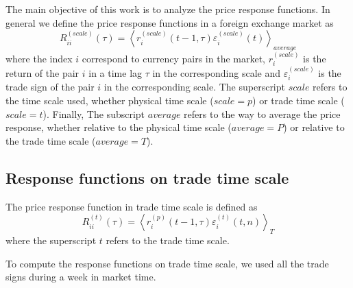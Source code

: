 The main objective of this work is to analyze the price response functions. In
general we define the price response functions in a foreign exchange market as
\begin{equation}\label{eq:response_general}
    R^{\left(scale\right)}_{ii}\left(\tau\right)=\left\langle
    r^{\left(scale\right)}_{i}\left(t-1, \tau\right)
    \varepsilon^{\left(scale\right)}_{i} \left(t\right)\right\rangle_{average}
\end{equation}
where the index $i$ correspond to currency pairs in the market,
$r^{\left(scale\right)}_{i}$ is the return of the pair $i$ in a time lag $\tau$
in the corresponding scale and $\varepsilon^{\left(scale\right)}_{i}$ is the
trade sign of the pair $i$ in the corresponding scale. The superscript $scale$
refers to the time scale used, whether physical time scale
($scale = p$) or trade time scale ($scale = t$). Finally, The subscript
$average$ refers to the way to average the price response, whether relative to
the physical time scale ($average = P$) or relative to the trade time scale
($average = T$).

\subsection{Response functions on trade time scale}
\label{subsec:response_function_trade}

The price response function in trade time scale is defined as
\begin{equation}\label{eq:response_functions_trade_scale_general}
    R^{\left(t\right)}_{ii}\left(\tau\right)=\left\langle r^{\left(p\right)}
    _{i}\left(t-1,\tau \right)\varepsilon_{i}^{\left(t\right)}
    \left(t, n\right)\right\rangle _{T}
\end{equation}
where the superscript $t$ refers to the trade time scale.

To compute the response functions on trade time scale, we used all the trade
signs during a week in market time.

